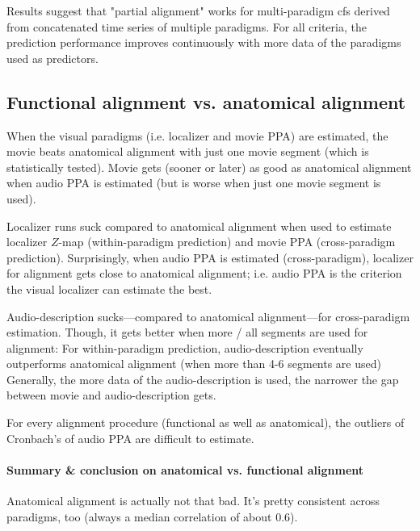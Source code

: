 
Results suggest that "partial alignment" works for multi-paradigm \ac{cfs}
derived from concatenated time series of multiple paradigms.
%
For all criteria, the prediction performance improves continuously with more
data of the paradigms used as predictors.


\subsection{Functional alignment vs. anatomical alignment}
%
When the visual paradigms (i.e. localizer and movie PPA) are estimated, the
movie beats anatomical alignment with just one movie segment (which is
statistically tested).
%
Movie gets (sooner or later) as good as anatomical alignment when audio PPA is
estimated (but is worse when just one movie segment is used).

%
Localizer runs suck compared to anatomical alignment when used to estimate
localizer $Z$-map (within-paradigm prediction) and movie PPA (cross-paradigm
prediction).
%
Surprisingly, when audio PPA is estimated (cross-paradigm), localizer for
alignment gets close to anatomical alignment; i.e. audio PPA is the criterion
the visual localizer can estimate the best.

%
Audio-description sucks---compared to anatomical alignment---for cross-paradigm
estimation.
%
Though, it gets better when more / all segments are used for alignment:
%
For within-paradigm prediction, audio-description eventually outperforms
anatomical alignment (when more than 4-6 segments are used)
%
Generally, the more data of the audio-description is used, the narrower the gap
between movie and audio-description gets.

%
For every alignment procedure (functional as well as anatomical), the outliers
of Cronbach's of audio PPA are difficult to estimate.


\paragraph{Summary \& conclusion on anatomical vs. functional alignment}


Anatomical alignment is actually not that bad.
%
It's pretty consistent across paradigms, too (always a median correlation of
about 0.6).



